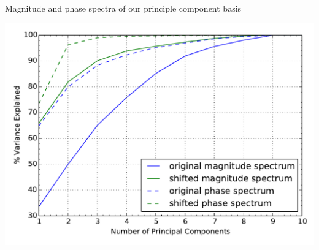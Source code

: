 \documentclass[a0,landscape]{a0poster}
\begin{document}
\begin{multicols}{4}
%
%
\begin{minipage}{\columnwidth}
\makeatletter
\newcommand{\@captype}{figure}
\makeatother
\centering
{}\qquad%
\caption{Magnitude and phase spectra of our principle component basis}
\end{minipage}


%
%
\begin{center}%
    \includegraphics[width=0.5\linewidth]{eigenergy.pdf}
\end{center}%



\end{multicols}
\end{document}
